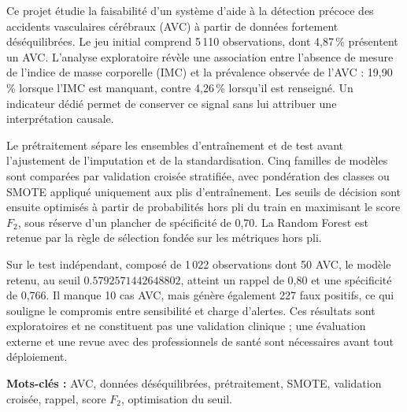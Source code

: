 Ce projet étudie la faisabilité d'un système d'aide à la détection précoce des accidents vasculaires cérébraux (AVC) à partir de données fortement déséquilibrées. Le jeu initial comprend 5\,110 observations, dont 4,87\,\% présentent un AVC. L'analyse exploratoire révèle une association entre l'absence de mesure de l'indice de masse corporelle (IMC) et la prévalence observée de l'AVC : 19,90\,\% lorsque l'IMC est manquant, contre 4,26\,\% lorsqu'il est renseigné. Un indicateur dédié permet de conserver ce signal sans lui attribuer une interprétation causale.

Le prétraitement sépare les ensembles d'entraînement et de test avant l'ajustement de l'imputation et de la standardisation. Cinq familles de modèles sont comparées par validation croisée stratifiée, avec pondération des classes ou SMOTE appliqué uniquement aux plis d'entraînement. Les seuils de décision sont ensuite optimisés à partir de probabilités hors pli du train en maximisant le score \(F_2\), sous réserve d'un plancher de spécificité de 0,70. La Random Forest est retenue par la règle de sélection fondée sur les métriques hors pli.

Sur le test indépendant, composé de 1\,022 observations dont 50 AVC, le modèle retenu, au seuil \(0.5792571442648802\), atteint un rappel de 0,80 et une spécificité de 0,766. Il manque 10 cas AVC, mais génère également 227 faux positifs, ce qui souligne le compromis entre sensibilité et charge d'alertes. Ces résultats sont exploratoires et ne constituent pas une validation clinique ; une évaluation externe et une revue avec des professionnels de santé sont nécessaires avant tout déploiement.

\medskip
\noindent\textbf{Mots-clés :} AVC, données déséquilibrées, prétraitement, SMOTE, validation croisée, rappel, score \(F_2\), optimisation du seuil.
